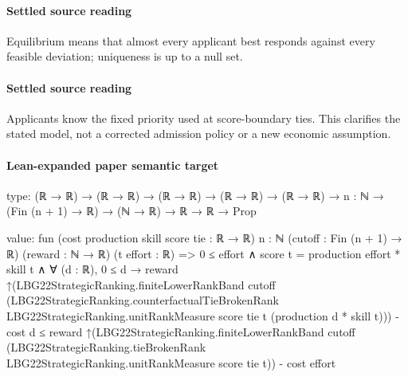 \documentclass[10pt]{article}
\begin{document}
\paragraph{Settled source reading}
\begin{sloppypar}
Equilibrium means that almost every applicant best responds against every feasible deviation;\allowbreak{} uniqueness is up to a null set.\allowbreak{}
\end{sloppypar}
\paragraph{Settled source reading}
\begin{sloppypar}
Applicants know the fixed priority used at score-\allowbreak{}boundary ties.\allowbreak{} This clarifies the stated model, not a corrected admission policy or a new economic assumption.\allowbreak{}
\end{sloppypar}

\paragraph{Lean-expanded paper semantic target}
\begin{ReviewVerbatim}
type:
(ℝ → ℝ) → (ℝ → ℝ) → (ℝ → ℝ) → (ℝ → ℝ) → (ℝ → ℝ) → {n : ℕ} → (Fin (n + 1) → ℝ) → (ℕ → ℝ) → ℝ → ℝ → Prop

value:
fun (cost production skill score tie : ℝ → ℝ) {n : ℕ} (cutoff : Fin (n + 1) → ℝ) (reward : ℕ → ℝ) (t effort : ℝ) =>
  0 ≤ effort ∧
    score t = production effort * skill t ∧
      ∀ (d : ℝ),
        0 ≤ d →
          reward
                ↑(LBG22StrategicRanking.finiteLowerRankBand cutoff
                    (LBG22StrategicRanking.counterfactualTieBrokenRank LBG22StrategicRanking.unitRankMeasure score tie t
                      (production d * skill t))) -
              cost d ≤
            reward
                ↑(LBG22StrategicRanking.finiteLowerRankBand cutoff
                    (LBG22StrategicRanking.tieBrokenRank LBG22StrategicRanking.unitRankMeasure score tie t)) -
              cost effort
\end{ReviewVerbatim}
\end{document}
